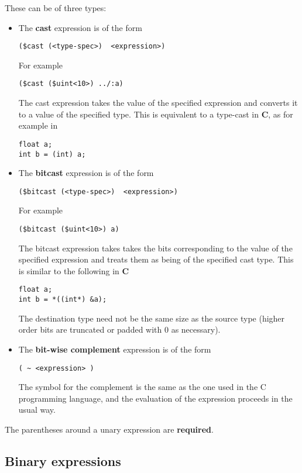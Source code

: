 \documentclass{article}
\begin{document}
These can be of three types:
\begin{itemize}
\item 
The {\bf cast}
expression is of the form
\begin{verbatim}
($cast (<type-spec>)  <expression>)
\end{verbatim} %
For example
\begin{verbatim}
($cast ($uint<10>) ../:a)
\end{verbatim}
The cast expression takes the value of the
specified expression and converts it to a value
of the specified type.  This is equivalent
to a type-cast in {\bf C}, as for example
in
\begin{verbatim}
float a;
int b = (int) a;
\end{verbatim}

\item 
The {\bf bitcast}
expression is of the form
\begin{verbatim}
($bitcast (<type-spec>)  <expression>)
\end{verbatim} %
For example
\begin{verbatim}
($bitcast ($uint<10>) a)
\end{verbatim}
The bitcast expression takes takes the bits
corresponding to the value of the specified expression
and treats them as being of the specified cast type.
This is similar to the following in {\bf C}
\begin{verbatim}
float a;
int b = *((int*) &a);
\end{verbatim}
The destination type need not
be the same size as the source type (higher
order bits are truncated or padded with 0
as necessary).
\item 
The {\bf bit-wise complement} expression is of the form
\begin{verbatim}
( ~ <expression> )
\end{verbatim}
The symbol for the complement is the same
as the one used in the C programming language,
and the evaluation of the expression proceeds in the
usual way.
\end{itemize}

The parentheses around a unary expression are
{\bf required}.


\subsection{Binary expressions}
\end{document}
